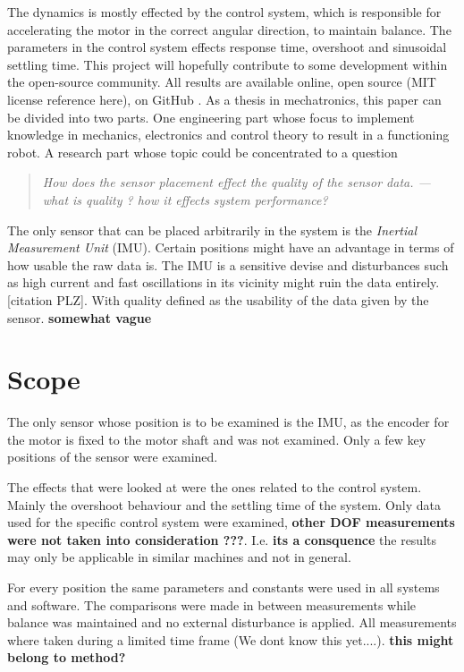 \documentclass[a4paper,11pt]{kth-mag}
\newenvironment{italicquotes}
{\begin{quote}\itshape}
{\end{quote}}
\begin{document}
The dynamics is mostly effected by the control system, which is responsible for accelerating the motor in the  correct angular direction, to maintain balance. The parameters in the control system effects response time, overshoot and sinusoidal settling time.
This project will hopefully contribute to some development within the open-source community.
All results are available online, open source (MIT license reference here), on GitHub \cite{Github}.
As a thesis in mechatronics, this paper can be divided into two parts. One engineering part whose focus to implement knowledge in mechanics, electronics and control theory to result in a functioning robot. A research part whose topic could be concentrated to a question 

\begin{italicquotes}
How does the sensor placement effect the quality of the sensor data. --- what is quality ? how it effects system performance?
\end{italicquotes}
The only sensor that can be placed arbitrarily in the system is the \textit{Inertial Measurement Unit} (IMU). Certain positions might have an advantage in terms of how usable the raw data is. The IMU is a sensitive devise and disturbances such as high current and fast oscillations in its vicinity might ruin the data entirely.[citation PLZ]. With quality defined as the usability of the data given by the sensor. \textbf{somewhat vague}

\section{Scope}
The only sensor whose position is to be examined is the IMU, as the encoder for the motor is fixed to the motor shaft and was not examined. Only a few key positions of the sensor were examined.

The effects that were looked at were the ones related to the control system. Mainly the overshoot behaviour and the settling time of the system. Only data used for the specific control system were examined, \textbf{other DOF measurements were not taken into consideration ???}. I.e. \textbf{its a consquence} the results may only be applicable in similar machines and not in general.

For every position the same parameters and constants were used in all systems and software. The comparisons were made in between measurements while balance was maintained and no external disturbance is applied. All measurements where taken during a limited time frame (We dont know this yet....).  \textbf{this might belong to method?}
\end{document}
